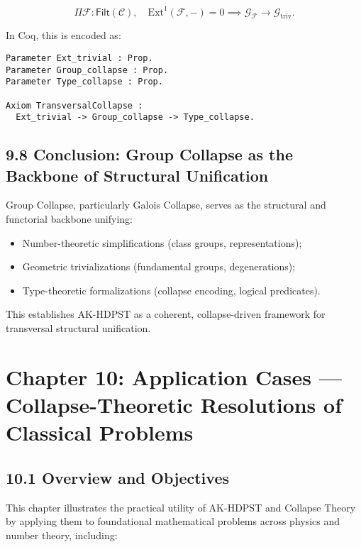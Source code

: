 \documentclass[11pt]{article}
\begin{document}
\[
\Pi \mathcal{F} : \mathsf{Filt}(\mathcal{C}), \quad \mathrm{Ext}^1(\mathcal{F}, -) = 0 \implies \mathcal{G}_{\mathcal{F}} \longrightarrow \mathcal{G}_{\mathrm{triv}}.
\]

In Coq, this is encoded as:

\begin{lstlisting}[language=Coq]
Parameter Ext_trivial : Prop.
Parameter Group_collapse : Prop.
Parameter Type_collapse : Prop.

Axiom TransversalCollapse :
  Ext_trivial -> Group_collapse -> Type_collapse.
\end{lstlisting}

\subsection*{9.8 Conclusion: Group Collapse as the Backbone of Structural Unification}

Group Collapse, particularly Galois Collapse, serves as the structural and functorial backbone unifying:

\begin{itemize}
    \item Number-theoretic simplifications (class groups, representations);
    \item Geometric trivializations (fundamental groups, degenerations);
    \item Type-theoretic formalizations (collapse encoding, logical predicates).
\end{itemize}

This establishes AK-HDPST as a coherent, collapse-driven framework for transversal structural unification.



\section{Chapter 10: Application Cases — Collapse-Theoretic Resolutions of Classical Problems}

\subsection*{10.1 Overview and Objectives}

This chapter illustrates the practical utility of AK-HDPST and Collapse Theory by applying them to foundational mathematical problems across physics and number theory, including:
\end{document}

